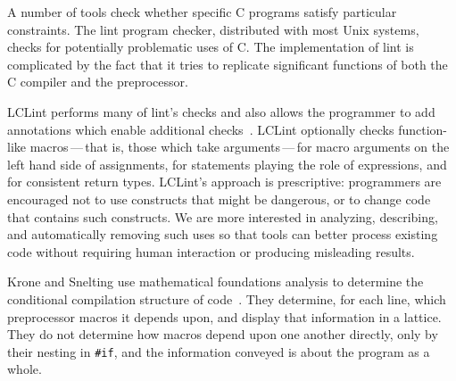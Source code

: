 \documentclass[11pt]{article}
\begin{document}
A number of tools check whether specific C programs satisfy particular
constraints.  The lint program checker, distributed with most Unix systems,
checks for potentially problematic uses of C\@.  The implementation of lint
is complicated by the fact that it tries to replicate significant functions
of both the C compiler and the preprocessor.

LCLint performs many of lint's checks and also
allows the programmer to add annotations which enable additional
checks~\cite{Evans-pldi96,Evans-fse94}.
LCLint optionally checks function-like
macros\,---\,that is, those which take arguments\,---\,for
macro arguments on the left hand side of assignments, for statements
playing the role of expressions, and for consistent return types.
LCLint's approach is prescriptive: programmers are encouraged not to use
constructs that might be dangerous, or to change code that contains such
constructs.  We are more interested in analyzing, describing, and
automatically removing such uses so that tools can better process existing
code without requiring human interaction or producing misleading results.


Krone and Snelting use mathematical foundations analysis to determine the
conditional compilation structure of code~\cite{Krone94}.  They determine,
for each line, which preprocessor macros it depends upon, and display that
information in a lattice.  They do not determine how macros depend upon one
another directly, only by their nesting in {\tt \#if}, and the information
conveyed is about the program as a whole.


{\small }
\end{document}
